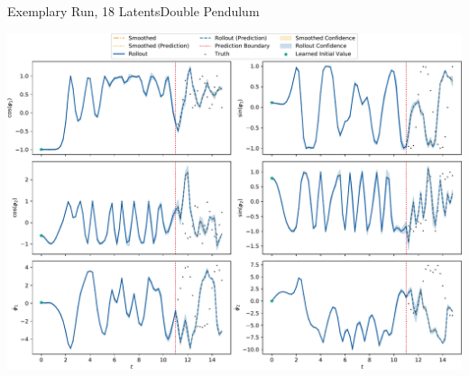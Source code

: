 \documentclass[
	aspectratio=43,
	color={accentcolor=1c},
	logo=false,
	colorframetitle=true,
	handout
]{tudabeamer}
\begin{document}
			\begin{frame}{Exemplary Run, 18 Latents}{Double Pendulum}
				\vspace{-0.45cm}
				\begin{center}
					\includegraphics[width=0.79\linewidth]{figures/experiments/acrobot-gym/rollout-observations-N0.pdf}
				\end{center}
			\end{frame}
\end{document}
